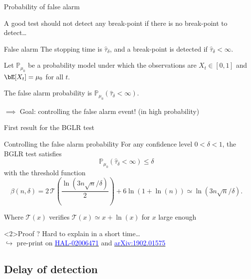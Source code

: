 \documentclass[11pt,english,ignorenonframetext,]{beamer}
\begin{document}
\begin{frame}{Probability of false alarm}

  A good test should not detect any break-point if there is no break-point to detect\ldots

  \begin{block}{False alarm}
    The stopping time is $\widehat{\tau}_\delta$,
    and a break-point is detected if $\widehat{\tau}_\delta < \infty$.

    Let $\mathbb{P}_{\mu_0}$ be a probability model under which the observations are $X_t \in[0,1]$
    and $\bE[X_t] = \mu_0$ for all $t$.

    The \alert{false alarm probability} is $\mathbb{P}_{\mu_0}(\widehat{\tau}_\delta < \infty)$.
  \end{block}

  \alert{$\implies$ Goal: controlling the false alarm event!} (in high probability)

\end{frame}

\begin{frame}{First result for the BGLR test}

  \begin{block}{Controlling the false alarm probability}
    For any \alert{confidence level} $0<\delta<1$,
    the BGLR test satisfies
    \[ \mathbb{P}_{\mu_0}(\widehat{\tau}_\delta < \infty) \leq \delta \]
    with the threshold function
    \[ \beta(n,\delta)= 2\,\mathcal{T}\left(\frac{\ln(3n\sqrt{n}/\delta)}{2}\right) + 6\ln(1+\ln(n)) \simeq \ln(3n \sqrt{n}/\delta).\]
  \end{block}

  Where $\mathcal{T}(x)$ verifies $\mathcal{T}(x)\simeq x + \ln(x)$ for $x$ large enough

  \begin{exampleblock}<2>{Proof ?}
    Hard to explain in a short time\ldots\\
    $\hookrightarrow$ pre-print on
    \href{https://hal.inria.fr/hal-02006471}{\textcolor{blue}{HAL-02006471}}
    and
    \href{https://arxiv.org/abs/1902.01575}{\textcolor{blue}{arXiv:1902.01575}}
  \end{exampleblock}

\end{frame}

\subsection{\hfill{}Delay of detection\hfill{}}
\end{document}
